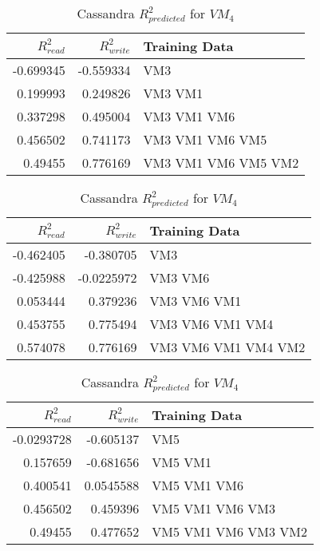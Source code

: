\begin{table}
\centering
\caption{Cassandra $R_{predicted}^2$ for $VM_4$}
\begin{tabular}{|r|r|l|} \hline
$R_{read}^2$&$R_{write}^2$&Training Data\\ \hline
-0.699345 & -0.559334  & VM3 \\ \hline 
0.199993 & 0.249826  & VM3 VM1 \\ \hline 
0.337298 &  0.495004 & VM3 VM1 VM6 \\ \hline 
0.456502 & 0.741173  & VM3 VM1 VM6 VM5 \\ \hline 
0.49455 & 0.776169  & VM3 VM1 VM6 VM5 VM2 \\ \hline 
\hline\end{tabular}
\label{table:cassandra1}

\centering
\caption{Cassandra $R_{predicted}^2$ for $VM_5$}
\begin{tabular}{|r|r|l|} \hline
$R_{read}^2$&$R_{write}^2$&Training Data\\ \hline
-0.462405 & -0.380705  & VM3 \\ \hline 
-0.425988 &  -0.0225972 & VM3 VM6 \\ \hline 
0.053444 &  0.379236 & VM3 VM6 VM1 \\ \hline 
0.453755 & 0.775494  & VM3 VM6 VM1 VM4 \\ \hline 
0.574078 & 0.776169  & VM3 VM6 VM1 VM4 VM2 \\ \hline 
\hline\end{tabular}
\label{table:cassandra2}

\centering
\caption{Cassandra $R_{predicted}^2$ for $VM_4$}
\begin{tabular}{|r|r|l|} \hline
$R_{read}^2$&$R_{write}^2$&Training Data\\ \hline
-0.0293728 & -0.605137  & VM5 \\ \hline 
0.157659 &  -0.681656 & VM5 VM1 \\ \hline 
0.400541 & 0.0545588  & VM5 VM1 VM6 \\ \hline 
0.456502 & 0.459396  & VM5 VM1 VM6 VM3 \\ \hline 
0.49455 & 0.477652  & VM5 VM1 VM6 VM3 VM2 \\ \hline 
\hline\end{tabular}
\label{table:cassandra3}


\end{table}
